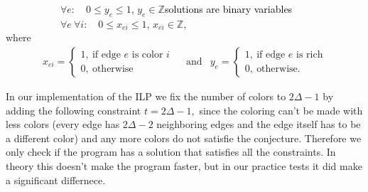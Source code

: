 \documentclass[12pt,a4paper]{amsart}
\theoremstyle{definition} %
\theoremstyle{plain} %
\newcommand{\Z}{\mathbb Z}
\begin{document}
        \ \ \ \ \ \ \ \ \ \ \ $\forall e: \quad 0 \leq y_{e} \leq 1$, $y_{e} \in \Z$\hfill \normalsize{\textcolor{black}{solutions are binary variables}}\\

        \ \ \ \ \ \ \ \ \ \ \ $\forall e \ \forall i: \quad 0 \leq x_{ei} \leq 1$, $x_{ei} \in \Z$,\\

        where
        \begin{align*} x_{ei} = 
            \begin{cases}
                1, \  \text{if edge $e$ is color $i$} \\
                0, \  \text{otherwise}
            \end{cases} \ \ & \text{and} & 
                y_{e} = 
            \begin{cases}
                1, \  \text{if edge $e$ is rich} \\
                0, \  \text{otherwise.}
            \end{cases}
        \end{align*}

        In our implementation of the ILP we fix the number of colors to $2 \Delta - 1$ by adding the following constraint $t = 2\Delta - 1,$
        since the coloring can't be made with less colors (every edge has $2 \Delta - 2$ neighboring edges and the edge itself has to be a different color) and any more colors do not satisfie the conjecture. Therefore we only check if the program has a solution that satisfies all the constraints. In theory this doesn't make the program faster, but in our practice tests it did make a significant differnece.\\

\end{document}

